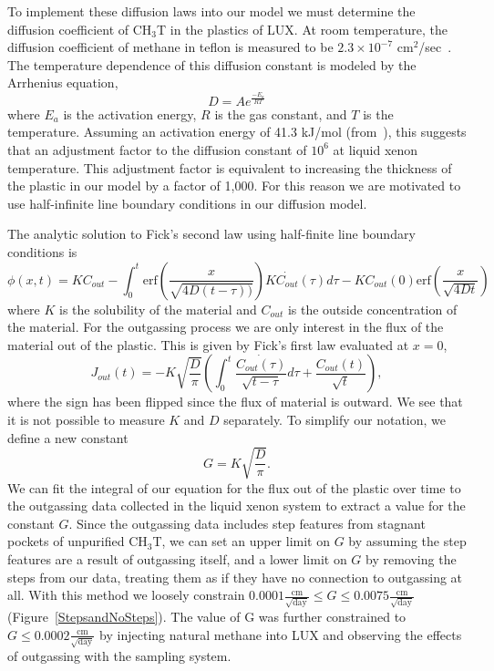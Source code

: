 To implement these diffusion laws into our model we must determine the diffusion coefficient of CH$_3$T in the plastics of LUX. At room temperature, the diffusion coefficient of methane in teflon is measured to be $2.3 \times 10^{-7}$ cm$^2$/sec~\cite{MethaneDiffusion}.  The temperature dependence of this diffusion constant is modeled by the Arrhenius equation,  
\begin{equation}
D=Ae^{\frac{-E_a}{RT}}
\end{equation}
where $E_a$ is the activation energy, $R$ is the gas constant, and $T$ is the temperature.  Assuming an activation energy of 41.3 kJ/mol (from~\cite{TeflonActivationEnergy}), this suggests that an adjustment factor to the diffusion constant of $10^6$ at liquid xenon
temperature. This adjustment factor is equivalent to increasing the thickness of the plastic in our model by a factor of 1,000. For this reason we are motivated
to use half-infinite line boundary conditions in our diffusion model.

The analytic solution to Fick's second law using half-finite line boundary conditions is
\begin{equation}
\phi(x,t) = KC_{out} - \int_0^t \text{erf}\left(\frac{x}{\sqrt{4D(t-\tau))}}\right)K \dot{C_{out}}(\tau)d\tau - KC_{out}(0)\text{erf}\left(\frac{x}{\sqrt{4Dt}}\right)
\end{equation}
where $K$ is the solubility of the material and $C_{out}$ is the outside concentration of the material.  For the outgassing process we are only interest in the flux of the material out of the plastic.  This is given by Fick's first law evaluated at $x=0$,
\begin{equation}
J_{out}(t)=-K\sqrt{\frac{D}{\pi}} \left( \int_0^t \frac{\dot{C_{out}(\tau)}}{\sqrt{t-\tau}}d\tau + \frac{C_{out}(t)}{\sqrt{t}} \right),
\end{equation}
where the sign has been flipped since the flux of material is outward. We see that it is not possible to measure $K$ and $D$ separately. To simplify our notation, we define a new constant
\begin{equation}
G=K\sqrt{\frac{D}{\pi}}.
\end{equation}
We can fit the integral of our equation for the flux out of the plastic over time to the outgassing data collected in the liquid xenon system to extract a value for the constant $G$. Since the outgassing data includes step features from stagnant pockets of unpurified CH$_3$T, we can set an upper limit on $G$ by assuming the step features are a result of outgassing itself, and a lower limit on $G$ by removing the steps from our data, treating them as if they have no connection to outgassing at all. With this method
we loosely constrain $0.0001 \frac{\text{cm}}{\sqrt{\text{day}}} \le G \le 0.0075  \frac{\text{cm}}{\sqrt{\text{day}}}$ (Figure~\ref{StepsandNoSteps}). The value of G was further constrained to $G \le 0.0002 \frac{\text{cm}}{\sqrt{\text{day}}}$ by injecting natural methane into LUX and observing the effects of outgassing with the sampling system. 

